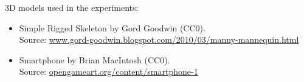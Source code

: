 \begin{appendices}
  3D models used in the experiments:
  \begin{itemize}
    \item Simple Rigged Skeleton by Gord Goodwin (CC0).\\Source: \href{http://gord-goodwin.blogspot.com/2010/03/manny-mannequin.html}{www.gord-goodwin.blogspot.com/2010/03/manny-mannequin.html}
    \item Smartphone by Brian MacIntosh (CC0).\\Source: \href{https://opengameart.org/content/smartphone-1}{opengameart.org/content/smartphone-1}
  \end{itemize}


  
\end{appendices}